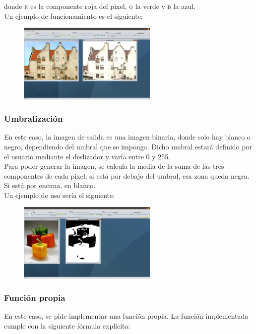 \documentclass[11pt,a4paper]{article}
\begin{document}
donde \textsc{r} es la componente roja del pixel, \textsc{g} la verde y \textsc{b} la azul.\\

Un ejemplo de funcionamiento es el siguiente:

\begin{figure}[H]
\centering
	\includegraphics[width=0.6\textwidth]{img/sepia.png}
\end{figure}

\subsubsection{Umbralización}
En este caso, la imagen de salida es una imagen binaria, donde solo hay blanco o negro, dependiendo del umbral que se imponga. Dicho umbral estará definido por el usuario mediante el deslizador y varía entre 0 y 255.\\

Para poder generar la imagen, se calcula la media de la suma de las tres componentes de cada pixel; si está por debajo del umbral, esa zona queda negra. Si está por encima, en blanco.\\

Un ejemplo de uso sería el siguiente:

\begin{figure}[H]
\centering
	\includegraphics[width=0.6\textwidth]{img/umbral.png}
\end{figure}

\subsubsection{Función propia}
En este caso, se pide implementar una función propia. La función implementada cumple con la siguiente fórmula explícita:
\end{document}
